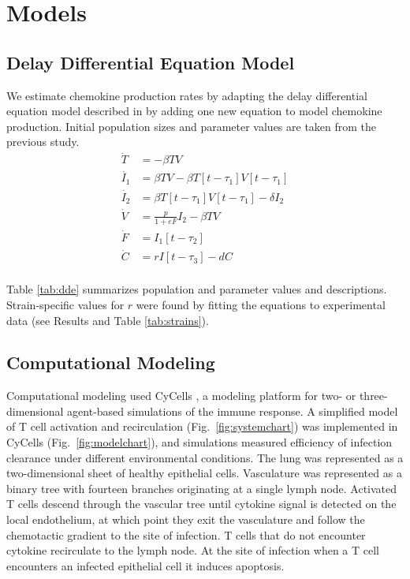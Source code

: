 \documentclass[10pt]{article}
\begin{document}
\section*{Models}

\subsection*{Delay Differential Equation Model}

We estimate chemokine production rates by adapting the delay differential equation model described in \cite{Mitchell2011} by adding one new equation to model chemokine production.  Initial population sizes and parameter values are taken from the previous study.
{\footnotesize
\begin{equation}
\begin{aligned}
\dot{T} &= - \beta T V \\
\dot{I_1} &= \beta T V - \beta T[t-\tau_1]V[t-\tau_1] \\
\dot{I_2} &= \beta T[t-\tau_1]V[t-\tau_1] - \delta I_2 \\
\dot{V} &= \frac{p}{1+eF} I_2  - \beta T V  \\
\dot{F} &=  I_1[t-\tau_2] \\
\dot{C} &= r I[t-\tau_3] - d C \\
\end{aligned}
\label{eq:dde}
\end{equation}
\vspace{.05in}
}

Table \ref{tab:dde} summarizes population and parameter values and descriptions.  Strain-specific values for $r$ were found by fitting the equations to experimental data (see Results and Table \ref{tab:strains}).


\subsection*{Computational Modeling}

Computational modeling used CyCells \cite{Warrender2006}, a modeling platform for two- or three-dimensional agent-based simulations of the immune response. A simplified model of T cell activation and recirculation (Fig.~\ref{fig:systemchart}) was implemented in CyCells (Fig.~\ref{fig:modelchart}), and simulations measured efficiency of infection clearance under different environmental conditions. The lung was represented as a two-dimensional sheet of healthy epithelial cells. Vasculature was represented as a binary tree with fourteen branches originating at a single lymph node. Activated T cells descend through the vascular tree until cytokine signal is detected on the local endothelium, at which point they exit the vasculature and follow the chemotactic gradient to the site of infection. T cells that do not encounter cytokine recirculate to the lymph node. At the site of infection when a T cell encounters an infected epithelial cell it induces apoptosis.
\end{document}
